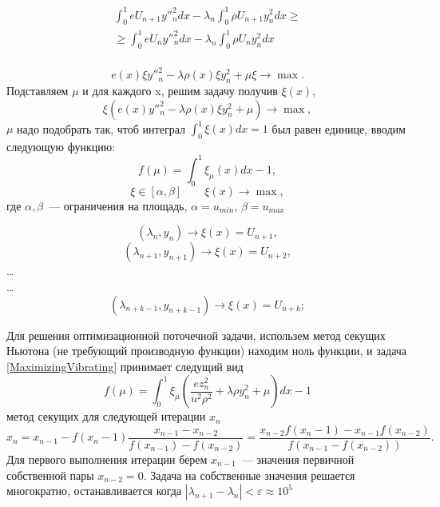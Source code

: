 \begin{equation*}
\begin{aligned}
\int_0^1{eU_{n+1}y''^2_ndx} - \lambda_n\int_0^1{\rho U_{n+1}y^2_ndx}\geqslant	\\
\geqslant \int_0^1{eU_ny''^2_ndx} - \lambda_n\int_0^1{\rho U_ny^2_ndx}\\
\end{aligned}
\end{equation*}

\begin{equation*} 
e(x)\xi y''^2_n - \lambda\rho(x)\xi y^2_n + \mu\xi \rightarrow \max.
\end{equation*}
%
%
%
Подставляем $\mu$  и для каждого x, решим задачу получив $\xi(x)$,
%
%
%
\begin{equation*} 
\xi(e(x) y''^2_n - \lambda\rho(x)\xi y^2_n + \mu) \rightarrow \max,
\end{equation*}
$\mu$ надо подобрать так, чтоб интеграл $\int_0^1{\xi(x)dx} = 1$ был равен единице, вводим следующую функцию: 
\begin{equation*} 
f(\mu)=\int_0^1{\xi_{\mu}(x)dx} - 1,
\end{equation*}
\begin{equation*} 
\xi \in [\alpha,\beta] \qquad \xi(x) \rightarrow \max,
\end{equation*}
%
%
%
где $\alpha , \beta$~--- ограничения на площадь, $\alpha= u_{min}$, $\beta= u_{max}$ 
%
%
%
\begin{center}
$$ (\lambda_n,y_n) \rightarrow \xi(x)= U_{n+1},$$
$$ (\lambda_{n+1},y_{n+1}) \rightarrow \xi(x)= U_{n+2},$$
\ldots \\
\ldots \\
$$(\lambda_{n+k-1},y_{n+k-1}) \rightarrow \xi(x)= U_{n+k};$$
\end{center}
%
%
%
%
Для решения оптимизационной поточечной задачи, использем метод секущих Ньютона (не требующий производную функции) находим ноль функции, и задача \eqref{MaximizingVibrating} принимает следущий вид
%
%
%
%
\begin{equation*} 
f(\mu)=\int_0^1{\xi_{\mu}(\frac{ez^2_n}{u^2\rho^2}+\lambda\rho y^2_n+\mu)dx} - 1
\end{equation*}
%
%
метод секущих для следующей итерации $x_n$
%
%
\begin{equation*} 
x_n=x_{n-1} - f(x_n -1) \frac{x_{n-1}-x_{n-2}}{f(x_{n-1})-f(x_{n-2})}=\frac{x_{n-2}f(x_n-1)-x_{n-1}f(x_{n-2})}{f(x_{n-1}-f(x_{n-2}))}.
\end{equation*}
Для первого выполнения итерации берем  $x_{n-1}$~--- значения первичной собственной пары $x_{n-2} = 0$. Задача на собственные значения решается многократно, останавливается когда $|\lambda_{n+1}-\lambda_n| <\varepsilon\approx 10^{5}$



